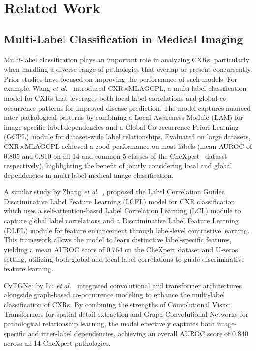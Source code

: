 \section{Related Work}
\subsection{Multi-Label Classification in Medical Imaging}
Multi-label classification plays an important role in analyzing CXRs, particularly when handling a diverse range of pathologies that overlap or present concurrently. Prior studies have focused on improving the performance of such models. For example, Wang \textit{et al.}~\cite{wang2024awareness} introduced CXR×MLAGCPL, a multi-label classification model for CXRs that leverages both local label correlations and global co-occurrence patterns for improved disease prediction. The model captures nuanced inter-pathological patterns by combining a Local Awareness Module (LAM) for image-specific label dependencies and a Global Co-occurrence Priori Learning (GCPL) module for dataset-wide label relationships. Evaluated on large datasets, CXR×MLAGCPL achieved a good performance on most labels (mean AUROC of 0.805 and 0.810 on all 14 and common 5 classes of the CheXpert~\cite{irvin2019chexpert} dataset respectively), highlighting the benefit of jointly considering local and global dependencies in multi-label medical image classification.

A similar study by Zhang \textit{et al.}~\cite{zhang2024discriminative}, proposed the Label Correlation Guided Discriminative Label Feature Learning (LCFL) model for CXR classification which uses a self-attention-based Label Correlation Learning (LCL) module to capture global label correlations and a Discriminative Label Feature Learning (DLFL) module for feature enhancement through label-level contrastive learning. This framework allows the model to learn distinctive label-specific features, yielding a mean AUROC score of 0.764 on the CheXpert dataset and U-zeros setting, utilizing both global and local label correlations to guide discriminative feature learning.

CvTGNet by Lu \textit{et al.}~\cite{lu2024CvTGNet} integrated convolutional and transformer architectures alongside graph-based co-occurrence modeling to enhance the multi-label classification of CXRs. By combining the strengths of Convolutional Vision Transformers for spatial detail extraction and Graph Convolutional Networks for pathological relationship learning, the model effectively captures both image-specific and inter-label dependencies, achieving an overall AUROC score of 0.840 across all 14 CheXpert pathologies.

